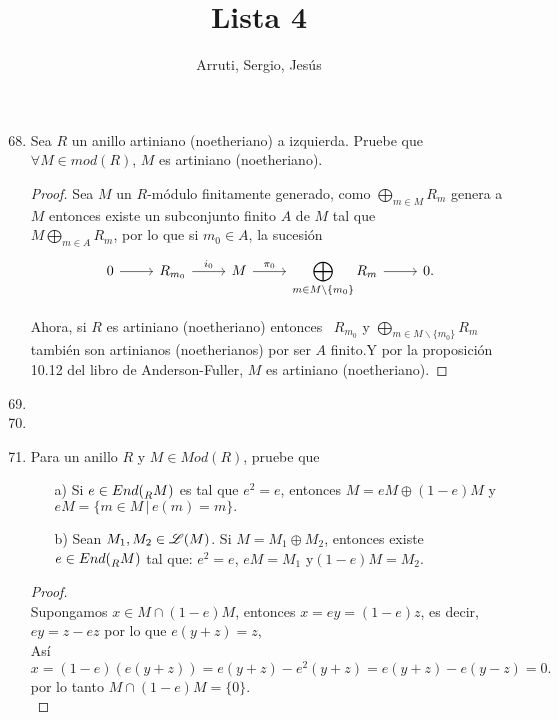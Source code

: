 \documentclass{article}
\title{Lista 4}
\author{Arruti, Sergio, Jesús}
\date{}
\begin{document}
	\maketitle
	\begin{enumerate}[label=\textbf{Ej \arabic*.}]
		\setcounter{enumi}{67}
\item
Sea $R$ un anillo artiniano (noetheriano) a izquierda. Pruebe que \\ $\forall M\in mod(R)$, $M$ es artiniano (noetheriano).
\begin{proof}
Sea $M$ un $R$-módulo finitamente generado, como $\displaystyle\bigoplus_{m\in M}R_m$ genera a $M$ entonces existe un subconjunto finito 
$A$ de $M$ tal que \\ $M\displaystyle\bigoplus_{m\in A}R_m$, por lo que si $m_0\in A$, la sucesión \[
\begin{tikzcd}
 0   \arrow{r}{}& R_{m_0} \arrow{r}{i_0} & M\arrow{r}{\pi_0} &\arrow{r}{} \displaystyle\bigoplus_{m\in M\backslash \{m_0\}}R_m &0.
\end{tikzcd}
\]

Ahora, si $R$ es artiniano (noetheriano) entonces \,\,\,$R_{m_0}$ y $ \displaystyle\bigoplus_{m\in M\backslash \{m_0\}}R_m$ \,\,\,también son 
artinianos (noetherianos) por ser $A$ finito.Y por la proposición 10.12 del libro de Anderson-Fuller, $M$ es artiniano (noetheriano).
\end{proof}

\item
\item
\item Para un anillo $R$ y $M\in Mod(R)$, pruebe que 
\begin{itemize}
\item[a)] Si $e\in End(\prescript{}{R}{M})$ es tal que $e^2=e$, entonces $M=eM\oplus (1-e)M$ y $eM=\{m\in M\,|\, e(m)=m\}.$
\item[b)] Sean $M_1,M_2\in \mathscr{L}(M)$. Si $M=M_1\oplus M_2$, entonces existe\\ $e\in End(\prescript{}{R}{M})$ tal que: $e^2=e$, $eM=M_1$\quad
y\quad $(1-e)M=M_2$.
\end{itemize}
\begin{proof}

\\
Supongamos $x\in M\cap(1-e)M$, entonces $x=ey=(1-e)z$, es decir, $ey=z-ez$ por lo que $e(y+z)=z$,\\
Así \[x=(1-e)(e(y+z))=e(y+z)-e^2(y+z)=e(y+z)-e(y-z)=0.
\]
por lo tanto $M\cap (1-e)M=\{0\}.$\\


\end{proof}
\end{enumerate}
\end{document}
